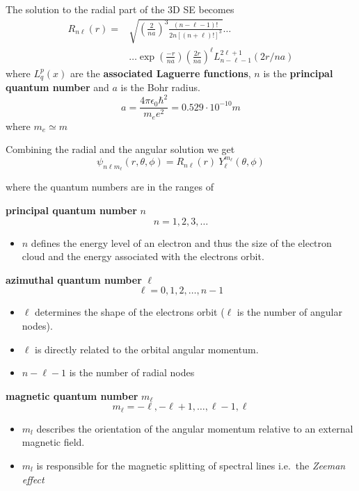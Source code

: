
The solution to the radial part of the 3D SE becomes
\begin{align*}
    R_{n\ell}(r) = & \sqrt{{\left(\frac{2}{na}\right)}^3\frac{(n-\ell-1)!}{2n{[(n+\ell)!]}^3}} \ldots                    \\
                   & \ldots\exp\left(\frac{-r}{na}\right){\left(\frac{2r}{na}\right)}^\ell L_{n-\ell-1}^{2\ell+1}(2r/na)
\end{align*}
where $L_q^p (x)$ are the \textbf{associated Laguerre functions}, $n$ is the \textbf{principal quantum number} and $a$ is the Bohr radius.
\begin{equation*}
    a = \frac{4\pi\epsilon_0\hbar^2}{m_e e^2}=0.529 \cdot 10^{-10}m
\end{equation*}
where $m_e\simeq m$


Combining the radial and the angular solution we get
\begin{equation*}
    \psi_{n\ell m_\ell}(r,\theta,\phi) = R_{n\ell}(r)\:Y_\ell^{m_\ell}(\theta, \phi)
\end{equation*}

where the quantum numbers are in the ranges of

\newpar{}
\textbf{principal quantum number} $n$
\noindent\begin{equation*}
    n = 1, 2, 3, \ldots
\end{equation*}
\begin{itemize}
    \item $n$ defines the energy level of an electron and thus the size of the electron cloud and the energy associated with the electrons orbit.
\end{itemize}

\newpar{}
\textbf{azimuthal quantum number} $\ell$
\noindent\begin{equation*}
    \ell = 0, 1, 2, \ldots , n-1
\end{equation*}
\begin{itemize}
    \item $\ell$ determines the shape of the electrons orbit ($\ell$ is the number of angular nodes).
    \item $\ell$ is directly related to the orbital angular momentum.
    \item $n-\ell-1$ is the number of radial nodes
\end{itemize}

\newpar{}
\textbf{magnetic quantum number} $m_\ell$
\noindent\begin{equation*}
    m_\ell =-\ell, -\ell+1, \ldots , \ell-1, \ell
\end{equation*}
\begin{itemize}
    \item $m_l$ describes the orientation of the angular momentum relative to an external magnetic field.
    \item $m_l$ is responsible for the magnetic splitting of spectral lines i.e.\ the \textit{Zeeman effect}
\end{itemize}

